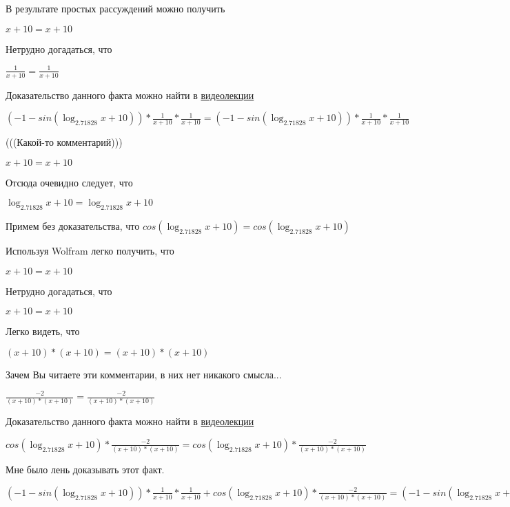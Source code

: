 \documentclass[12pt,a4paper,fleqn]{article}
\theoremstyle{definition}
\begin{document}
В результате простых рассуждений можно получить

$ x  +  10  =  x  +  10 $

Нетрудно догадаться, что

$\frac{ 1 }{ x  +  10 }
 = \frac{ 1 }{ x  +  10 }
$

Доказательство данного факта можно найти в \href{https://www.youtube.com/watch?v=dQw4w9WgXcQ}{видеолекции}

$( -1  - sin(\log_{ 2.71828 }{ x  +  10 })) * \frac{ 1 }{ x  +  10 }
 * \frac{ 1 }{ x  +  10 }
 = ( -1  - sin(\log_{ 2.71828 }{ x  +  10 })) * \frac{ 1 }{ x  +  10 }
 * \frac{ 1 }{ x  +  10 }
$

(((Какой-то комментарий)))

$ x  +  10  =  x  +  10 $

Отсюда очевидно следует, что

$\log_{ 2.71828 }{ x  +  10 } = \log_{ 2.71828 }{ x  +  10 }$

Примем без доказательства, что
$cos(\log_{ 2.71828 }{ x  +  10 }) = cos(\log_{ 2.71828 }{ x  +  10 })$

Используя Wolfram легко получить, что

$ x  +  10  =  x  +  10 $

Нетрудно догадаться, что

$ x  +  10  =  x  +  10 $

Легко видеть, что

$( x  +  10 ) * ( x  +  10 ) = ( x  +  10 ) * ( x  +  10 )$

Зачем Вы читаете эти комментарии, в них нет никакого смысла...

$\frac{ -2 }{( x  +  10 ) * ( x  +  10 )}
 = \frac{ -2 }{( x  +  10 ) * ( x  +  10 )}
$

Доказательство данного факта можно найти в \href{https://www.youtube.com/watch?v=dQw4w9WgXcQ}{видеолекции}

$cos(\log_{ 2.71828 }{ x  +  10 }) * \frac{ -2 }{( x  +  10 ) * ( x  +  10 )}
 = cos(\log_{ 2.71828 }{ x  +  10 }) * \frac{ -2 }{( x  +  10 ) * ( x  +  10 )}
$

Мне было лень доказывать этот факт.

$( -1  - sin(\log_{ 2.71828 }{ x  +  10 })) * \frac{ 1 }{ x  +  10 }
 * \frac{ 1 }{ x  +  10 }
 + cos(\log_{ 2.71828 }{ x  +  10 }) * \frac{ -2 }{( x  +  10 ) * ( x  +  10 )}
 = ( -1  - sin(\log_{ 2.71828 }{ x  +  10 })) * \frac{ 1 }{ x  +  10 }
 * \frac{ 1 }{ x  +  10 }
 + cos(\log_{ 2.71828 }{ x  +  10 }) * \frac{ -2 }{( x  +  10 ) * ( x  +  10 )}
$
\end{document}
